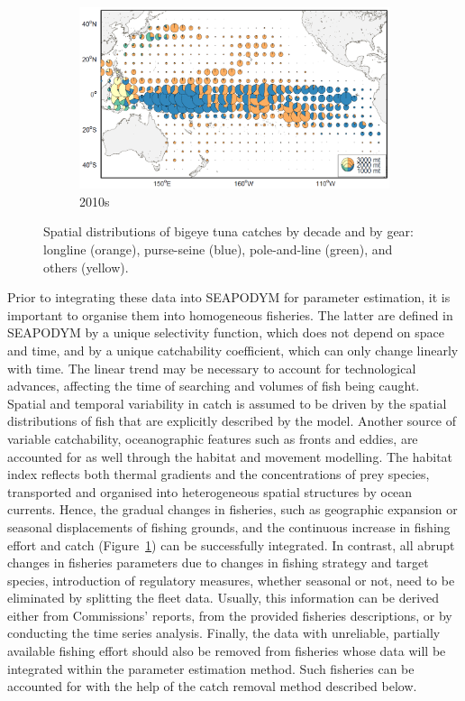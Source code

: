 \begin{figure}[H]
\begin{subfigure}[b]{0.485\textwidth}
\end{subfigure}
\begin{subfigure}[b]{0.485\textwidth}
\caption{2010s}
\includegraphics[width=1\textwidth]{chapter4/figs/bet_catch_2d_10s}
\end{subfigure}
\caption{Spatial distributions of bigeye tuna catches by decade and by gear: longline (orange), purse-seine (blue), pole-and-line (green), and others (yellow).}
\label{fig:catches_maps}
\end{figure}

Prior to integrating these data into SEAPODYM for parameter estimation, it is important to organise them into homogeneous fisheries. The latter are defined in SEAPODYM by a unique selectivity function, which does not depend on space and time, and by a unique catchability coefficient, which can only change linearly with time. The linear trend may be necessary to account for technological advances, affecting the time of searching and volumes of fish being caught. Spatial and temporal variability in catch is assumed to be driven by the spatial distributions of fish that are explicitly described by the model. Another source of variable catchability,  oceanographic features such as fronts and eddies, are accounted for as well through the habitat and movement modelling. The habitat index reflects both thermal gradients and the concentrations of prey species, transported and organised into heterogeneous spatial structures by ocean currents. Hence, the gradual changes in fisheries, such as geographic expansion or seasonal displacements of fishing grounds, and the continuous increase in fishing effort and catch (Figure~\ref{fig:catches_maps}) can be successfully integrated. In contrast, all abrupt changes in fisheries parameters due to changes in fishing strategy and target species, introduction of regulatory measures, whether seasonal or not, need to be eliminated by splitting the fleet data. Usually, this information can be derived either from Commissions' reports, from the provided fisheries descriptions, or by conducting the time series analysis. Finally, the data with unreliable, partially available fishing effort should also be removed from fisheries whose data will be integrated within the parameter estimation method. Such fisheries can be accounted for with the help of the catch removal method described below. 

